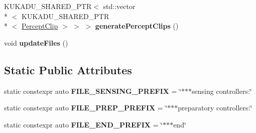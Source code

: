 \begin{DoxyCompactItemize}
\item 
\hypertarget{classkukadu_1_1ComplexController_afaf3b27706451e42afda6fc3aae0d89c}{K\-U\-K\-A\-D\-U\-\_\-\-S\-H\-A\-R\-E\-D\-\_\-\-P\-T\-R$<$ std\-::vector\\*
$<$ K\-U\-K\-A\-D\-U\-\_\-\-S\-H\-A\-R\-E\-D\-\_\-\-P\-T\-R\\*
$<$ \hyperlink{classkukadu_1_1PerceptClip}{Percept\-Clip} $>$ $>$ $>$ {\bfseries generate\-Percept\-Clips} ()}\label{classkukadu_1_1ComplexController_afaf3b27706451e42afda6fc3aae0d89c}

\item 
\hypertarget{classkukadu_1_1ComplexController_a12a8e0f0333997f1a86fbac2721525e6}{void {\bfseries update\-Files} ()}\label{classkukadu_1_1ComplexController_a12a8e0f0333997f1a86fbac2721525e6}

\end{DoxyCompactItemize}
\subsection*{Static Public Attributes}
\begin{DoxyCompactItemize}
\item 
\hypertarget{classkukadu_1_1ComplexController_a84d383d7c0934d9b3770c626256f0e18}{static constexpr auto {\bfseries F\-I\-L\-E\-\_\-\-S\-E\-N\-S\-I\-N\-G\-\_\-\-P\-R\-E\-F\-I\-X} = \char`\"{}$\ast$$\ast$$\ast$sensing controllers\-:\char`\"{}}\label{classkukadu_1_1ComplexController_a84d383d7c0934d9b3770c626256f0e18}

\item 
\hypertarget{classkukadu_1_1ComplexController_a7b18430010fc93226dc2a61add216b1b}{static constexpr auto {\bfseries F\-I\-L\-E\-\_\-\-P\-R\-E\-P\-\_\-\-P\-R\-E\-F\-I\-X} = \char`\"{}$\ast$$\ast$$\ast$preparatory controllers\-:\char`\"{}}\label{classkukadu_1_1ComplexController_a7b18430010fc93226dc2a61add216b1b}

\item 
\hypertarget{classkukadu_1_1ComplexController_ae054423fe5c6195a509e110ab4989b5b}{static constexpr auto {\bfseries F\-I\-L\-E\-\_\-\-E\-N\-D\-\_\-\-P\-R\-E\-F\-I\-X} = \char`\"{}$\ast$$\ast$$\ast$end\char`\"{}}\label{classkukadu_1_1ComplexController_ae054423fe5c6195a509e110ab4989b5b}

\end{DoxyCompactItemize}
